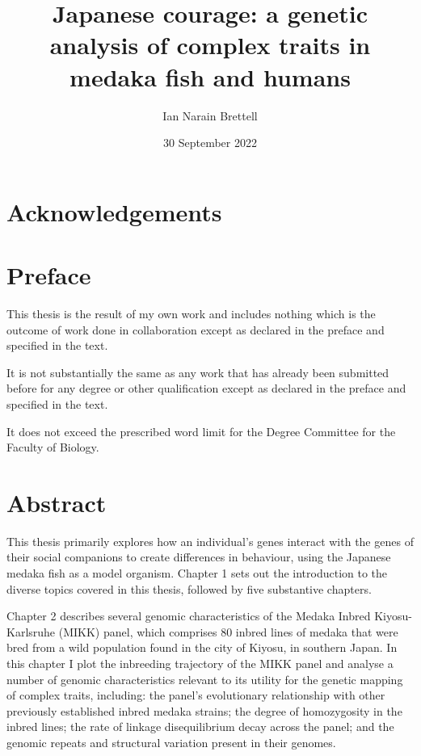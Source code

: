 \documentclass[
]{book}
\title{Japanese courage: a genetic analysis of complex traits in medaka fish and humans}
\author{Ian Narain Brettell}
\date{30 September 2022}
\begin{document}
\maketitle

{
\setcounter{tocdepth}{1}
\tableofcontents
}
\hypertarget{acknowledgements}{%
\chapter*{Acknowledgements}\label{acknowledgements}}

\hypertarget{preface}{%
\chapter*{Preface}\label{preface}}

This thesis is the result of my own work and includes nothing which is the outcome of work done in collaboration except as declared in the preface and specified in the text.

It is not substantially the same as any work that has already been submitted before for any degree or other qualification except as declared in the preface and specified in the text.

It does not exceed the prescribed word limit for the Degree Committee for the Faculty of Biology.

\hypertarget{abstract}{%
\chapter*{Abstract}\label{abstract}}

This thesis primarily explores how an individual's genes interact with the genes of their social companions to create differences in behaviour, using the Japanese medaka fish as a model organism. Chapter 1 sets out the introduction to the diverse topics covered in this thesis, followed by five substantive chapters.

Chapter 2 describes several genomic characteristics of the Medaka Inbred Kiyosu-Karlsruhe (MIKK) panel, which comprises 80 inbred lines of medaka that were bred from a wild population found in the city of Kiyosu, in southern Japan. In this chapter I plot the inbreeding trajectory of the MIKK panel and analyse a number of genomic characteristics relevant to its utility for the genetic mapping of complex traits, including: the panel's evolutionary relationship with other previously established inbred medaka strains; the degree of homozygosity in the inbred lines; the rate of linkage disequilibrium decay across the panel; and the genomic repeats and structural variation present in their genomes.
\end{document}
